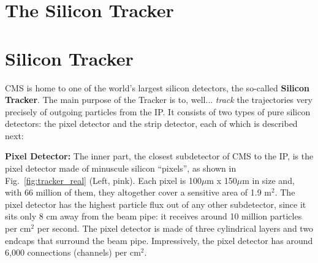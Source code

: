 \section{The Silicon Tracker}\label{sec:tracker}

\section{Silicon Tracker}
CMS is home to one of the world's largest silicon detectors, the so-called {\bf Silicon Tracker}.
The main purpose of the Tracker is to, well... \emph{track} the trajectories very precisely of outgoing particles from the IP.
It consists of two types of pure silicon detectors: the pixel detector and the strip detector, each of which is described next: 

{\bf Pixel Detector:} The inner part, the closest subdetector of CMS to the IP, is the pixel detector made of minuscule silicon ``pixels'', as shown in Fig.~\ref{fig:tracker_real} (Left, pink).
Each pixel is 100$\mu$m x 150$\mu$m in size and, with 66 million of them, they altogether cover a sensitive area of 1.9 m$^2$. 
The pixel detector has the highest particle flux out of any other subdetector, since it sits only 8 cm away from the beam pipe:
it receives around 10 million particles per cm$^2$ per second.
The pixel detector is made of three cylindrical layers and two endcaps that surround the beam pipe.
Impressively, the pixel detector has around 6,000 connections (channels) per cm$^2$.

